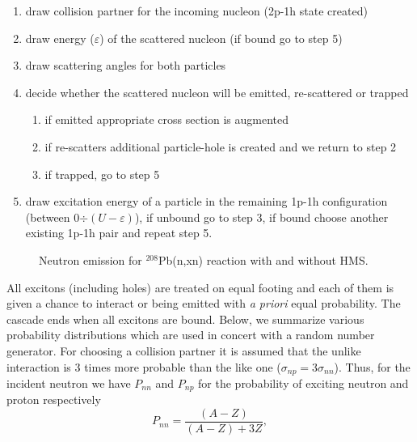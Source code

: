 \begin{enumerate}
\item draw collision partner for the incoming nucleon (2p-1h state created)

\item draw energy ($\varepsilon$) of the scattered nucleon (if bound go to
step 5)

\item draw scattering angles for both particles

\item decide whether the scattered nucleon will be emitted, re-scattered or
trapped

\begin{enumerate}
\item if emitted appropriate cross section is augmented

\item if re-scatters additional particle-hole is created and we return to
step 2

\item if trapped, go to step 5
\end{enumerate}

\item draw excitation energy of a particle in the remaining 1p-1h
configuration (between 0$\div(U-\varepsilon)$), if unbound go to step 3, if
bound choose another existing 1p-1h pair and repeat step 5.
\end{enumerate}

\begin{figure}[htbp]
\caption{Neutron emission for $^{208}$Pb(n,xn) reaction with and without HMS.
}
\label{pb208HMS}
\end{figure}

All excitons (including holes) are treated on equal footing and each of them
is given a chance to interact or being emitted with \emph{a priori} equal
probability. The cascade ends when all excitons are bound. Below, we
summarize various probability distributions which are used in concert with a
random number generator. For choosing a collision partner it is assumed that
the unlike interaction is 3 times more probable than the like one ($%
\sigma_{np}=3\sigma_{nn}$). Thus, for the incident neutron we have $P_{nn}$
and $P_{np}$ for the probability of exciting neutron and proton respectively
\begin{equation}
P_{nn}=%
\frac{(A-Z)}{(A-Z)+3Z},  \label{Pnn}
\end{equation}

